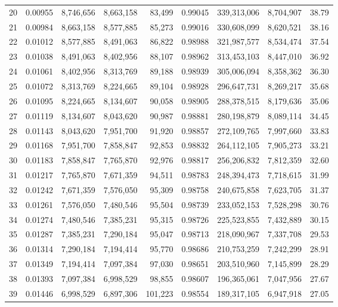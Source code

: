 \begin{longtable}{rrrrrrrrr}
20 & 0.00955 & 8,746,656 & 8,663,158 & 83,499 & 0.99045 & 339,313,006 & 8,704,907 & 38.79 \\
21 & 0.00984 & 8,663,158 & 8,577,885 & 85,273 & 0.99016 & 330,608,099 & 8,620,521 & 38.16 \\
22 & 0.01012 & 8,577,885 & 8,491,063 & 86,822 & 0.98988 & 321,987,577 & 8,534,474 & 37.54 \\
23 & 0.01038 & 8,491,063 & 8,402,956 & 88,107 & 0.98962 & 313,453,103 & 8,447,010 & 36.92 \\
24 & 0.01061 & 8,402,956 & 8,313,769 & 89,188 & 0.98939 & 305,006,094 & 8,358,362 & 36.30 \\
25 & 0.01072 & 8,313,769 & 8,224,665 & 89,104 & 0.98928 & 296,647,731 & 8,269,217 & 35.68 \\
26 & 0.01095 & 8,224,665 & 8,134,607 & 90,058 & 0.98905 & 288,378,515 & 8,179,636 & 35.06 \\
27 & 0.01119 & 8,134,607 & 8,043,620 & 90,987 & 0.98881 & 280,198,879 & 8,089,114 & 34.45 \\
28 & 0.01143 & 8,043,620 & 7,951,700 & 91,920 & 0.98857 & 272,109,765 & 7,997,660 & 33.83 \\
29 & 0.01168 & 7,951,700 & 7,858,847 & 92,853 & 0.98832 & 264,112,105 & 7,905,273 & 33.21 \\
30 & 0.01183 & 7,858,847 & 7,765,870 & 92,976 & 0.98817 & 256,206,832 & 7,812,359 & 32.60 \\
31 & 0.01217 & 7,765,870 & 7,671,359 & 94,511 & 0.98783 & 248,394,473 & 7,718,615 & 31.99 \\
32 & 0.01242 & 7,671,359 & 7,576,050 & 95,309 & 0.98758 & 240,675,858 & 7,623,705 & 31.37 \\
33 & 0.01261 & 7,576,050 & 7,480,546 & 95,504 & 0.98739 & 233,052,153 & 7,528,298 & 30.76 \\
34 & 0.01274 & 7,480,546 & 7,385,231 & 95,315 & 0.98726 & 225,523,855 & 7,432,889 & 30.15 \\
35 & 0.01287 & 7,385,231 & 7,290,184 & 95,047 & 0.98713 & 218,090,967 & 7,337,708 & 29.53 \\
36 & 0.01314 & 7,290,184 & 7,194,414 & 95,770 & 0.98686 & 210,753,259 & 7,242,299 & 28.91 \\
37 & 0.01349 & 7,194,414 & 7,097,384 & 97,030 & 0.98651 & 203,510,960 & 7,145,899 & 28.29 \\
38 & 0.01393 & 7,097,384 & 6,998,529 & 98,855 & 0.98607 & 196,365,061 & 7,047,956 & 27.67 \\
39 & 0.01446 & 6,998,529 & 6,897,306 & 101,223 & 0.98554 & 189,317,105 & 6,947,918 & 27.05 \\

\end{longtable}
